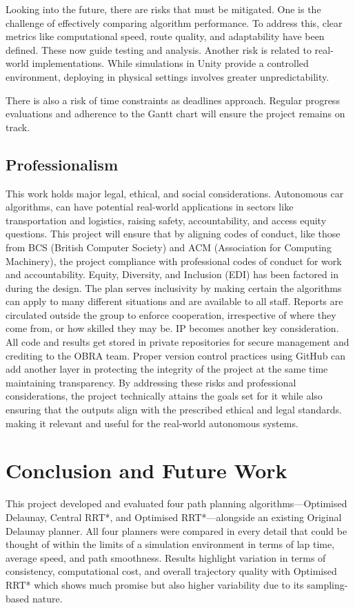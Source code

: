 \documentclass[a4paper,11pt]{report}
\begin{document}
Looking into the future, there are risks that must be mitigated.
One is the challenge of effectively comparing algorithm performance. To address this,
clear metrics like computational speed, route quality, and adaptability have been
defined. These now guide testing and analysis. Another risk is related to real-world
implementations. While simulations in Unity provide a controlled environment,
deploying in physical settings involves greater unpredictability.

There is also a risk of time constraints as deadlines approach. Regular progress 
evaluations and adherence to the Gantt chart will ensure the project remains on track.

\section{Professionalism}
This work holds major legal, ethical, and social considerations. Autonomous
car algorithms, can have potential real-world
applications in sectors like transportation and logistics, raising safety,
accountability, and access equity questions. This project will ensure
that by aligning codes of conduct, like those from BCS (British Computer
Society) and ACM (Association for Computing Machinery),  the project
compliance with professional codes of conduct for work and accountability.
Equity, Diversity, and Inclusion (EDI) has been factored in during the design.
The plan serves inclusivity by making certain the algorithms can apply to many
different situations and are available to all staff. Reports are circulated outside
the group to enforce cooperation, irrespective of where they come from, or how
skilled they may be.
IP becomes another key consideration. All code and results get stored in private
repositories for secure management and crediting to the OBRA team.
Proper version control practices using GitHub can add another layer in protecting the
integrity of the project at the same time maintaining transparency.
By addressing these risks and professional considerations, the project technically
attains the goals set for it while also ensuring that the outputs align with the prescribed ethical and legal standards.
making it relevant and useful for the real-world autonomous systems.
\newpage

\chapter{Conclusion and Future Work}

This project developed and evaluated four path planning algorithms—Optimised Delaunay, 
Central RRT*, and Optimised RRT*—alongside an existing Original Delaunay planner. 
All four planners were compared in every detail that could be thought of within the limits of a 
simulation environment in terms of lap time, average speed, and path smoothness. Results highlight 
variation in terms of consistency, computational cost, and overall trajectory quality with Optimised 
RRT* which shows much promise but also higher variability due to its sampling-based nature.
\end{document}
